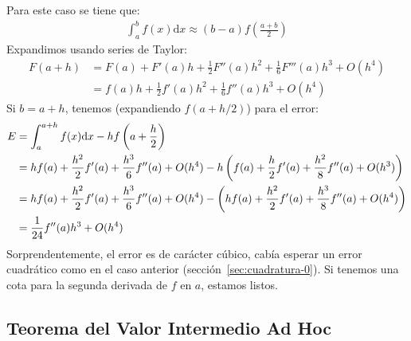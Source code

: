   Para este caso se tiene que:
  \begin{align*}
    \int_a^b f(x) \mathrm{d} x
      \approx (b - a) f \left( \frac{a + b}{2} \right)
  \end{align*}
  Expandimos usando series de Taylor:
  \begin{align*}
    F(a + h)
      &= F(a) + F'(a) h
           + \frac{1}{2} F''(a) h^2 + \frac{1}{6} F'''(a) h^3
           + O(h^4) \\
      &= f(a) h + \frac{1}{2} f'(a) h^2 + \frac{1}{6} f''(a) h^3
           + O(h^4)
  \end{align*}
  Si \(b = a+h\),
  tenemos
  (expandiendo \(f(a + h / 2)\))
  para el error:
  \begin{align}
    E
      &= \int_a^{a + h} f(x) \mathrm{d} x - h f\left( a + \frac{h}{2} \right)
              \notag \\
      &= h f(a) + \frac{h^2}{2} f'(a)
           + \frac{h^3}{6} f''(a)
           + O(h^4)
        - h \left(
              f(a) + \frac{h}{2} f'(a) + \frac{h^2}{8} f''(a) + O(h^3)
            \right)
              \notag \\
      &= h f(a) + \frac{h^2}{2} f'(a) + \frac{h^3}{6} f''(a)
           + O(h^4)
        - \left(
            h f(a) + \frac{h^2}{2} f'(a) + \frac{h^3}{8} f''(a)
              + O(h^4)
          \right)
              \notag \\
      &= \frac{1}{24} f''(a) h^3
           + O(h^4)
              \label{05::ErrrObtenido}
  \end{align}
  Sorprendentemente,
  el error es de carácter cúbico,
  cabía esperar un error cuadrático como en el caso anterior
  (sección~\ref{sec:cuadratura-0}).
  Si tenemos una cota para la segunda derivada de \(f\) en \(a\),
  estamos listos.

\subsection{Teorema del Valor Intermedio Ad Hoc}
\label{sec:mean-value-ad-hoc}

